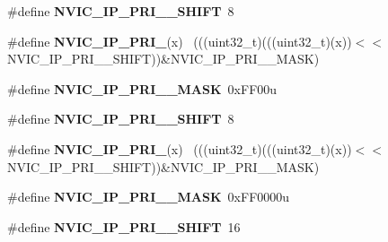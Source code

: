 \begin{DoxyCompactItemize}
\item 
\hypertarget{group___n_v_i_c___register___masks_ga9ee6ca77dddd98a4fa7e773cdec250fa}{}\#define {\bfseries N\+V\+I\+C\+\_\+\+I\+P\+\_\+\+P\+R\+I\+\_\+\_\+\+S\+H\+I\+F\+T}~8\label{group___n_v_i_c___register___masks_ga9ee6ca77dddd98a4fa7e773cdec250fa}

\item 
\hypertarget{group___n_v_i_c___register___masks_ga3dcbefbc6778e050b0d487572ea5c795}{}\#define {\bfseries N\+V\+I\+C\+\_\+\+I\+P\+\_\+\+P\+R\+I\+\_}(x)                                            ~(((uint32\+\_\+t)(((uint32\+\_\+t)(x))$<$$<$N\+V\+I\+C\+\_\+\+I\+P\+\_\+\+P\+R\+I\+\_\+\_\+\+S\+H\+I\+F\+T))\&N\+V\+I\+C\+\_\+\+I\+P\+\_\+\+P\+R\+I\+\_\+\_\+\+M\+A\+S\+K)\label{group___n_v_i_c___register___masks_ga3dcbefbc6778e050b0d487572ea5c795}

\item 
\hypertarget{group___n_v_i_c___register___masks_ga480e53d7e2d091174c03809cbbea3b68}{}\#define {\bfseries N\+V\+I\+C\+\_\+\+I\+P\+\_\+\+P\+R\+I\+\_\+\_\+\+M\+A\+S\+K}~0x\+F\+F00u\label{group___n_v_i_c___register___masks_ga480e53d7e2d091174c03809cbbea3b68}

\item 
\hypertarget{group___n_v_i_c___register___masks_ga14b2c9a7ea14a343605d020edd9f186a}{}\#define {\bfseries N\+V\+I\+C\+\_\+\+I\+P\+\_\+\+P\+R\+I\+\_\+\_\+\+S\+H\+I\+F\+T}~8\label{group___n_v_i_c___register___masks_ga14b2c9a7ea14a343605d020edd9f186a}

\item 
\hypertarget{group___n_v_i_c___register___masks_ga57a79ce218b5e3668b2ceb27a2dd94e8}{}\#define {\bfseries N\+V\+I\+C\+\_\+\+I\+P\+\_\+\+P\+R\+I\+\_}(x)                                              ~(((uint32\+\_\+t)(((uint32\+\_\+t)(x))$<$$<$N\+V\+I\+C\+\_\+\+I\+P\+\_\+\+P\+R\+I\+\_\+\_\+\+S\+H\+I\+F\+T))\&N\+V\+I\+C\+\_\+\+I\+P\+\_\+\+P\+R\+I\+\_\+\_\+\+M\+A\+S\+K)\label{group___n_v_i_c___register___masks_ga57a79ce218b5e3668b2ceb27a2dd94e8}

\item 
\hypertarget{group___n_v_i_c___register___masks_ga020ccac56651e055f659cbcc0387d0b2}{}\#define {\bfseries N\+V\+I\+C\+\_\+\+I\+P\+\_\+\+P\+R\+I\+\_\+\_\+\+M\+A\+S\+K}~0x\+F\+F0000u\label{group___n_v_i_c___register___masks_ga020ccac56651e055f659cbcc0387d0b2}

\item 
\hypertarget{group___n_v_i_c___register___masks_ga9ecbd3ab4a0623c8001df6917c2764b2}{}\#define {\bfseries N\+V\+I\+C\+\_\+\+I\+P\+\_\+\+P\+R\+I\+\_\+\_\+\+S\+H\+I\+F\+T}~16\label{group___n_v_i_c___register___masks_ga9ecbd3ab4a0623c8001df6917c2764b2}


\end{DoxyCompactItemize}
